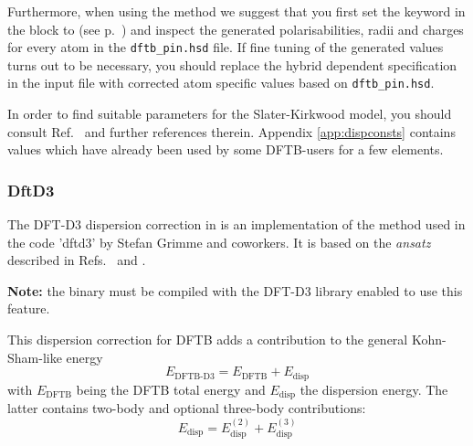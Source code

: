 Furthermore, when using the  method we
suggest that you first set the  keyword in the
 block to  (see p.~) and
inspect the generated polarisabilities, radii and charges for every
atom in the \verb|dftb_pin.hsd| file. If fine tuning of the generated
values turns out to be necessary, you should replace the hybrid
dependent specification in the input file with corrected atom
specific values based on \verb|dftb_pin.hsd|.

In order to find suitable parameters for the Slater-Kirkwood model,
you should consult Ref.~\cite{elstner-jcp-114-5149} and further
references therein. Appendix \ref{app:dispconsts} contains values
which have already been used by some DFTB-users for a few elements.

\subsubsection{DftD3}
\label{sec:dftbp.DftD3}

The DFT-D3 dispersion correction in \dftbp{} is an implementation of the method
used in the code 'dftd3' by Stefan Grimme and coworkers.  It is based on the
{\it ansatz} described in Refs.~\cite{grimme-jcp-132-154104} and
\cite{grimme-jcp-32-1456-1465}.

\textbf{Note:} the \dftbp{} binary must be compiled with the DFT-D3 library
enabled to use this feature.

This dispersion correction for DFTB adds a contribution to the general
Kohn-Sham-like energy
\begin{equation*}
  E_{\text{DFTB-D3}} = E_{\text{DFTB}} + E_{\text{disp}}
\end{equation*}
with $E_{\text{DFTB}}$ being the DFTB total energy and $E_{\text{disp}}$ the
dispersion energy. The latter contains two-body and optional three-body
contributions:
\begin{equation*}
  E_{\text{disp}} = E_{\text{disp}}^{(2)} + E_{\text{disp}}^{(3)}
\end{equation*}

